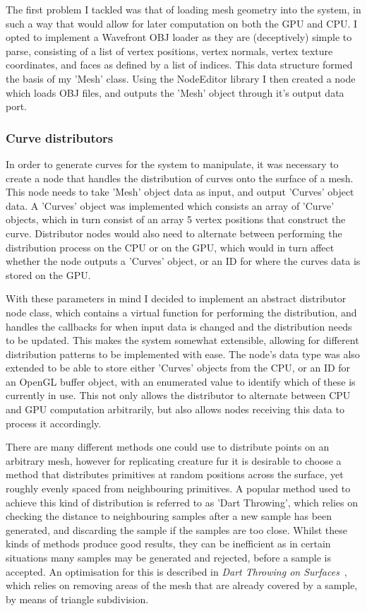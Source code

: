 \documentclass[]{acmsiggraph}
\begin{document}
The first problem I tackled was that of loading mesh geometry into the system, in such a way that would allow for later computation on both the GPU and CPU. I opted to implement a Wavefront OBJ loader as they are (deceptively) simple to parse, consisting of a list of vertex positions, vertex normals, vertex texture coordinates, and faces as defined by a list of indices. This data structure formed the basis of my 'Mesh' class. Using the NodeEditor library I then created a node which loads OBJ files, and outputs the 'Mesh' object through it's output data port.

\subsubsection{Curve distributors} \label{sec:distributors}

In order to generate curves for the system to manipulate, it was necessary to create a node that handles the distribution of curves onto the surface of a mesh. This node needs to take 'Mesh' object data as input, and output 'Curves' object data. A 'Curves' object was implemented which consists an array of 'Curve' objects, which in turn consist of an array 5 vertex positions that construct the curve. Distributor nodes would also need to alternate between performing the distribution process on the CPU or on the GPU, which would in turn affect whether the node outputs a 'Curves' object, or an ID for where the curves data is stored on the GPU.

With these parameters in mind I decided to implement an abstract distributor node class, which contains a virtual function for performing the distribution, and handles the callbacks for when input data is changed and the distribution needs to be updated. This makes the system somewhat extensible, allowing for different distribution patterns to be implemented with ease. The node's data type was also extended to be able to store either 'Curves' objects from the CPU, or an ID for an OpenGL buffer object, with an enumerated value to identify which of these is currently in use. This not only allows the distributor to alternate between CPU and GPU computation arbitrarily, but also allows nodes receiving this data to process it accordingly.

There are many different methods one could use to distribute points on an arbitrary mesh, however for replicating creature fur it is desirable to choose a method that distributes primitives at random positions across the surface, yet roughly evenly spaced from neighbouring primitives. A popular method used to achieve this kind of distribution is referred to as 'Dart Throwing', which relies on checking the distance to neighbouring samples after a new sample has been generated, and discarding the sample if the samples are too close. Whilst these kinds of methods produce good results, they can be inefficient as in certain situations many samples may be generated and rejected, before a sample is accepted. An optimisation for this is described in \textit{Dart Throwing on Surfaces}~\cite{dartThrowing}, which relies on removing areas of the mesh that are already covered by a sample, by means of triangle subdivision.
\end{document}

